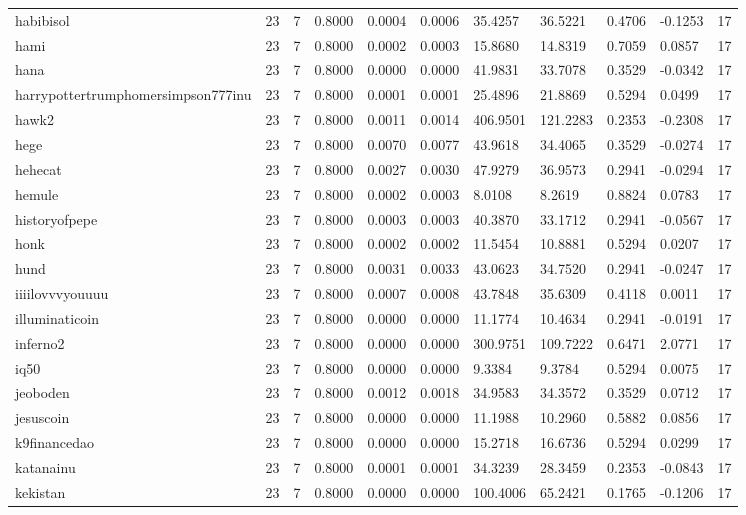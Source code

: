 \begin{table}[htbp]
\begin{tabular}{lllllllllll}
habibisol & 23 & 7 & 0.8000 & 0.0004 & 0.0006 & 35.4257 & 36.5221 & 0.4706 & -0.1253 & 17 \\
hami & 23 & 7 & 0.8000 & 0.0002 & 0.0003 & 15.8680 & 14.8319 & 0.7059 & 0.0857 & 17 \\
hana & 23 & 7 & 0.8000 & 0.0000 & 0.0000 & 41.9831 & 33.7078 & 0.3529 & -0.0342 & 17 \\
harrypottertrumphomersimpson777inu & 23 & 7 & 0.8000 & 0.0001 & 0.0001 & 25.4896 & 21.8869 & 0.5294 & 0.0499 & 17 \\
hawk2 & 23 & 7 & 0.8000 & 0.0011 & 0.0014 & 406.9501 & 121.2283 & 0.2353 & -0.2308 & 17 \\
hege & 23 & 7 & 0.8000 & 0.0070 & 0.0077 & 43.9618 & 34.4065 & 0.3529 & -0.0274 & 17 \\
hehecat & 23 & 7 & 0.8000 & 0.0027 & 0.0030 & 47.9279 & 36.9573 & 0.2941 & -0.0294 & 17 \\
hemule & 23 & 7 & 0.8000 & 0.0002 & 0.0003 & 8.0108 & 8.2619 & 0.8824 & 0.0783 & 17 \\
historyofpepe & 23 & 7 & 0.8000 & 0.0003 & 0.0003 & 40.3870 & 33.1712 & 0.2941 & -0.0567 & 17 \\
honk & 23 & 7 & 0.8000 & 0.0002 & 0.0002 & 11.5454 & 10.8881 & 0.5294 & 0.0207 & 17 \\
hund & 23 & 7 & 0.8000 & 0.0031 & 0.0033 & 43.0623 & 34.7520 & 0.2941 & -0.0247 & 17 \\
iiiilovvvyouuuu & 23 & 7 & 0.8000 & 0.0007 & 0.0008 & 43.7848 & 35.6309 & 0.4118 & 0.0011 & 17 \\
illuminaticoin & 23 & 7 & 0.8000 & 0.0000 & 0.0000 & 11.1774 & 10.4634 & 0.2941 & -0.0191 & 17 \\
inferno2 & 23 & 7 & 0.8000 & 0.0000 & 0.0000 & 300.9751 & 109.7222 & 0.6471 & 2.0771 & 17 \\
iq50 & 23 & 7 & 0.8000 & 0.0000 & 0.0000 & 9.3384 & 9.3784 & 0.5294 & 0.0075 & 17 \\
jeoboden & 23 & 7 & 0.8000 & 0.0012 & 0.0018 & 34.9583 & 34.3572 & 0.3529 & 0.0712 & 17 \\
jesuscoin & 23 & 7 & 0.8000 & 0.0000 & 0.0000 & 11.1988 & 10.2960 & 0.5882 & 0.0856 & 17 \\
k9financedao & 23 & 7 & 0.8000 & 0.0000 & 0.0000 & 15.2718 & 16.6736 & 0.5294 & 0.0299 & 17 \\
katanainu & 23 & 7 & 0.8000 & 0.0001 & 0.0001 & 34.3239 & 28.3459 & 0.2353 & -0.0843 & 17 \\
kekistan & 23 & 7 & 0.8000 & 0.0000 & 0.0000 & 100.4006 & 65.2421 & 0.1765 & -0.1206 & 17 \\

\end{tabular}
\end{table}
